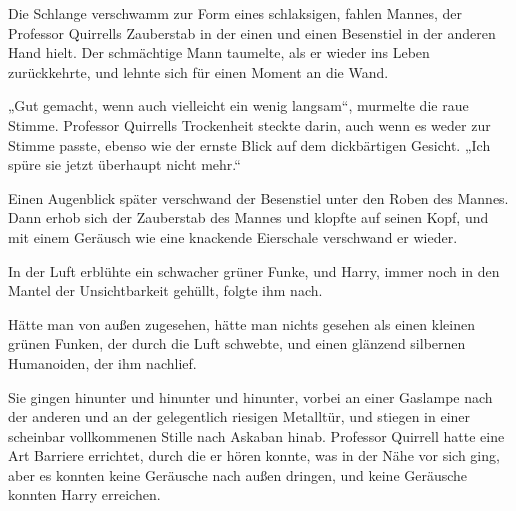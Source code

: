 Die Schlange verschwamm zur Form eines schlaksigen, fahlen Mannes, der Professor Quirrells Zauberstab in der einen und einen Besenstiel in der anderen Hand hielt. Der schmächtige Mann taumelte, als er wieder ins Leben zurückkehrte, und lehnte sich für einen Moment an die Wand.

„Gut gemacht, wenn auch vielleicht ein wenig langsam“, murmelte die raue Stimme. Professor Quirrells Trockenheit steckte darin, auch wenn es weder zur Stimme passte, ebenso wie der ernste Blick auf dem dickbärtigen Gesicht. „Ich spüre sie jetzt überhaupt nicht mehr.“

Einen Augenblick später verschwand der Besenstiel unter den Roben des Mannes. Dann erhob sich der Zauberstab des Mannes und klopfte auf seinen Kopf, und mit einem Geräusch wie eine knackende Eierschale verschwand er wieder.

In der Luft erblühte ein schwacher grüner Funke, und Harry, immer noch in den Mantel der Unsichtbarkeit gehüllt, folgte ihm nach.

Hätte man von außen zugesehen, hätte man nichts gesehen als einen kleinen grünen Funken, der durch die Luft schwebte, und einen glänzend silbernen Humanoiden, der ihm nachlief.

\later

Sie gingen hinunter und hinunter und hinunter, vorbei an einer Gaslampe nach der anderen und an der gelegentlich riesigen Metalltür, und stiegen in einer scheinbar vollkommenen Stille nach Askaban hinab. Professor Quirrell hatte eine Art Barriere errichtet, durch die er hören konnte, was in der Nähe vor sich ging, aber es konnten keine Geräusche nach außen dringen, und keine Geräusche konnten Harry erreichen.

